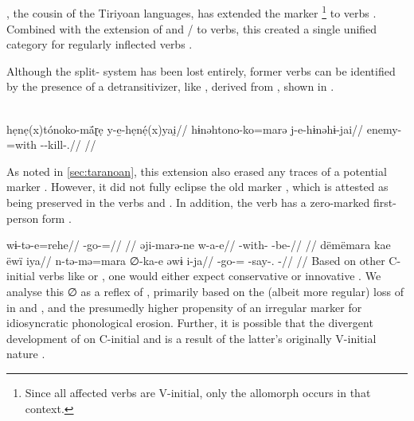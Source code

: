 \subsection{\carijo {}}
\label{sec:carijo}
\carijo, the cousin of the Tiriyoan languages, has extended the  marker \footnote{Since all affected  verbs are V-initial, only the  allomorph  occurs in that context.} to  verbs \parencite[105--107]{meira1998proto}.
Combined with the extension of   and  / to  verbs, this created a single unified  category for regularly inflected verbs .
%

%
Although the split- system has been lost entirely, former  verbs can be identified by the presence of a detransitivizer, like  , derived from   \parencite[179]{robayo2000avance}, shown in .

\carijo \parencite[][79]{koch1908hiana}\\
\begingl
\glpreamble hẹnẹ(x)tónoko-mā́ɽẹ y-e̱-hẹnẹ́(x)yai̯//
\gla hɨnəhtono-ko=marə j-e-hɨnəhɨ-jai//
\glb enemy-=with --kill-.//
\glft {}//
\endgl
\xe
%


As noted in \cref{sec:taranoan}, this extension also erased any traces of a potential \PTar {} marker .
However, it did not fully eclipse the old  marker , which is attested as being preserved in the verbs    and   .
In addition, the verb   has a zero-marked first-person form .

\carijo \parencite[][5, 42, personal communication]{guerrero2016karihona}
\begingl
\gla wɨ-tə-e=rehe//
\glb {}-go-=//
\glft {}//
\endgl
{}
\begingl
\gla əji-marə-ne w-a-e//
\glb {}-with- -be-//
\glft {}//
\endgl
{}
\begingl
\glpreamble dëmëmara kae ëwï iya//
\gla n-tə-mə=mara ∅-ka-e əwɨ i-ja//
\glb {}-go-= -say-.  -//
\glft {}//
\endgl
\xe
Based on other C-initial verbs like   or  , one would either expect conservative  or innovative .
We analyse this ∅ as a reflex of , primarily based on the (albeit more regular) loss of  in \ikpeng and \hixka, and the presumedly higher propensity of an irregular marker for idiosyncratic phonological erosion.
Further, it is possible that the divergent development of  on C-initial   and   is a result of the latter's originally V-initial nature .

